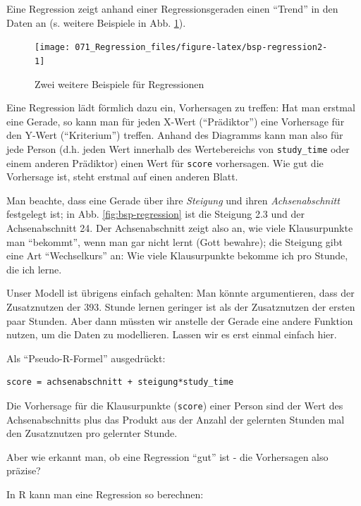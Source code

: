 \documentclass[12pt,ngerman,]{book}
\theoremstyle{definition}
\theoremstyle{definition}
\theoremstyle{remark}
\begin{document}
Eine Regression zeigt anhand einer Regressionsgeraden einen ``Trend'' in
den Daten an (s. weitere Beispiele in Abb. \ref{fig:bsp-regression2}).

\begin{figure}

{\centering \texttt{[image: 071\_Regression\_files/figure-latex/bsp-regression2-1]} 

}

\caption{Zwei weitere Beispiele für Regressionen}\label{fig:bsp-regression2}
\end{figure}

Eine Regression lädt förmlich dazu ein, Vorhersagen zu treffen: Hat man
erstmal eine Gerade, so kann man für jeden X-Wert (``Prädiktor'') eine
Vorhersage für den Y-Wert (``Kriterium'') treffen. Anhand des Diagramms
kann man also für jede Person (d.h. jeden Wert innerhalb des
Wertebereichs von \texttt{study\_time} oder einem anderen Prädiktor)
einen Wert für \texttt{score} vorhersagen. Wie gut die Vorhersage ist,
steht erstmal auf einen anderen Blatt.

Man beachte, dass eine Gerade über ihre \emph{Steigung} und ihren
\emph{Achsenabschnitt} festgelegt ist; in Abb. \ref{fig:bsp-regression}
ist die Steigung 2.3 und der Achsenabschnitt 24. Der Achsenabschnitt
zeigt also an, wie viele Klausurpunkte man ``bekommt'', wenn man gar
nicht lernt (Gott bewahre); die Steigung gibt eine Art ``Wechselkurs''
an: Wie viele Klausurpunkte bekomme ich pro Stunde, die ich lerne.

Unser Modell ist übrigens einfach gehalten: Man könnte argumentieren,
dass der Zusatznutzen der 393. Stunde lernen geringer ist als der
Zusatznutzen der ersten paar Stunden. Aber dann müssten wir anstelle der
Gerade eine andere Funktion nutzen, um die Daten zu modellieren. Lassen
wir es erst einmal einfach hier.

Als ``Pseudo-R-Formel'' ausgedrückt:

\begin{verbatim}
score = achsenabschnitt + steigung*study_time
\end{verbatim}

Die Vorhersage für die Klausurpunkte (\texttt{score}) einer Person sind
der Wert des Achsenabschnitts plus das Produkt aus der Anzahl der
gelernten Stunden mal den Zusatznutzen pro gelernter Stunde.

Aber wie erkannt man, ob eine Regression ``gut'' ist - die Vorhersagen
also präzise?

In R kann man eine Regression so berechnen:
\end{document}
